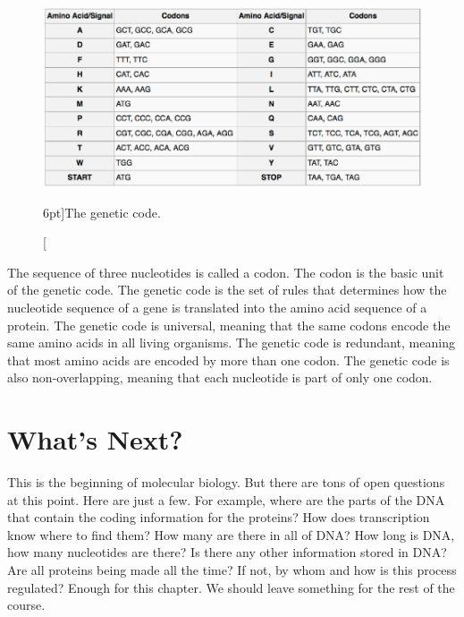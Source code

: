 \begin{figure}
    \includegraphics{figs/molbiol/code-of-life.png}
    \caption[][6pt]{The genetic code.}
    \label{fig:code-of-life}
\end{figure}

The sequence of three nucleotides is called a codon. The codon is the basic unit of the genetic code. The genetic code is the set of rules that determines how the nucleotide sequence of a gene is translated into the amino acid sequence of a protein. The genetic code is universal, meaning that the same codons encode the same amino acids in all living organisms. The genetic code is redundant, meaning that most amino acids are encoded by more than one codon. The genetic code is also non-overlapping, meaning that each nucleotide is part of only one codon.

\section{What's Next?}

This is the beginning of molecular biology. But there are tons of open questions at this point. Here are just a few. For example, where are the parts of the DNA that contain the coding information for the proteins? How does transcription know where to find them? How many are there in all of DNA? How long is DNA, how many nucleotides are there? Is there any other information stored in DNA? Are all proteins being made all the time? If not, by whom and how is this process regulated? Enough for this chapter. We should leave something for the rest of the course.